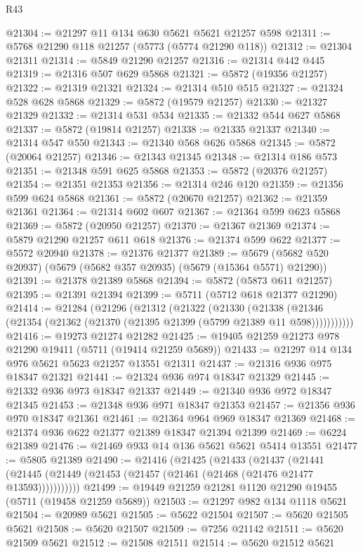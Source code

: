 \begin{lexlean}{R43}
\begin{coremodule}
@21304 := @21297 @11 @134 @630 @5621 @5621 @21257 @598
@21311 := @5768 @21290 @118 @21257 (@5773 (@5774 @21290 @118))
@21312 := @21304 @21311
@21314 := @5849 @21290 @21257
@21316 := @21314 @442 @445
@21319 := @21316 @507 @629 @5868
@21321 := @5872 (@19356 @21257)
@21322 := @21319 @21321
@21324 := @21314 @510 @515
@21327 := @21324 @528 @628 @5868
@21329 := @5872 (@19579 @21257)
@21330 := @21327 @21329
@21332 := @21314 @531 @534
@21335 := @21332 @544 @627 @5868
@21337 := @5872 (@19814 @21257)
@21338 := @21335 @21337
@21340 := @21314 @547 @550
@21343 := @21340 @568 @626 @5868
@21345 := @5872 (@20064 @21257)
@21346 := @21343 @21345
@21348 := @21314 @186 @573
@21351 := @21348 @591 @625 @5868
@21353 := @5872 (@20376 @21257)
@21354 := @21351 @21353
@21356 := @21314 @246 @120
@21359 := @21356 @599 @624 @5868
@21361 := @5872 (@20670 @21257)
@21362 := @21359 @21361
@21364 := @21314 @602 @607
@21367 := @21364 @599 @623 @5868
@21369 := @5872 (@20950 @21257)
@21370 := @21367 @21369
@21374 := @5879 @21290 @21257 @611 @618
@21376 := @21374 @599 @622
@21377 := @5572 @20940
@21378 := @21376 @21377
@21389 := @5679 (@5682 @520 @20937) (@5679 (@5682 @357 @20935) (@5679 (@15364 @5571) @21290))
@21391 := @21378 @21389 @5868
@21394 := @5872 (@5873 @611 @21257)
@21395 := @21391 @21394
@21399 := @5711 (@5712 @618 @21377 @21290)
@21414 := @21284
    (@21296
      (@21312
        (@21322
          (@21330
            (@21338 (@21346 (@21354 (@21362 (@21370 (@21395 @21399 (@5799 @21389 @11 @598)))))))))))
@21416 := @19273 @21274 @21282
@21425 := @19405 @21259 @21273 @978 @21290 @19411 (@5711 (@19414 @21259 @5689))
@21433 := @21297 @14 @134 @976 @5621 @5623 @21257 @13551 @21311
@21437 := @21316 @936 @975 @18347 @21321
@21441 := @21324 @936 @974 @18347 @21329
@21445 := @21332 @936 @973 @18347 @21337
@21449 := @21340 @936 @972 @18347 @21345
@21453 := @21348 @936 @971 @18347 @21353
@21457 := @21356 @936 @970 @18347 @21361
@21461 := @21364 @964 @969 @18347 @21369
@21468 := @21374 @936 @622 @21377 @21389 @18347 @21394 @21399
@21469 := @6224 @21389
@21476 := @21469 @933 @14 @136 @5621 @5621 @5414 @13551
@21477 := @5805 @21389
@21490 := @21416
    (@21425
      (@21433
        (@21437
          (@21441 (@21445 (@21449 (@21453 (@21457 (@21461 (@21468 (@21476 @21477 @13593)))))))))))
@21499 := @19449 @21259 @21281 @1120 @21290 @19455 (@5711 (@19458 @21259 @5689))
@21503 := @21297 @982 @134 @1118 @5621
@21504 := @20989 @5621
@21505 := @5622 @21504
@21507 := @5620 @21505 @5621
@21508 := @5620 @21507
@21509 := @7256 @21142
@21511 := @5620 @21509 @5621
@21512 := @21508 @21511
@21514 := @5620 @21512 @5621

\end{coremodule}
\end{lexlean}
